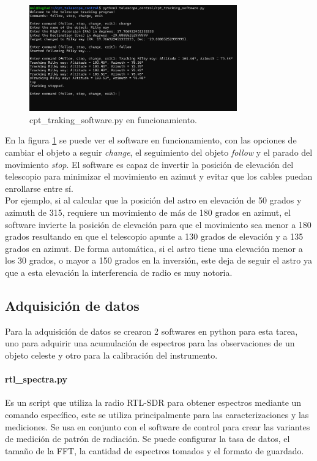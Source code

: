 \begin{figure}
    \centering
    \includegraphics[width=0.8\textwidth]{img/traking}
    \caption{cpt\_traking\_software.py en funcionamiento.}
    \label{fig:control}
\end{figure}

En la figura \ref{fig:control} se puede ver el software en funcionamiento, con las opciones de cambiar el objeto a seguir \textit{change}, el seguimiento del objeto \textit{follow} y el parado del movimiento \textit{stop}. El software es capaz de invertir la posición de elevación del telescopio para minimizar el movimiento en azimut y evitar que los cables puedan enrollarse entre sí.\\

Por ejemplo, si al calcular que la posición del astro en elevación de 50 grados y azimuth de 315, requiere un movimiento de más de 180 grados en azimut, el software invierte la posición de elevación para que el movimiento sea menor a 180 grados resultando en que el telescopio apunte a 130 grados de elevación y a 135 grados en azimut. De forma automática, si el astro tiene una elevación menor a los 30 grados, o mayor a 150 grados en la inversión, este deja de seguir el astro ya que a esta elevación la interferencia de radio es muy notoria.\\

\subsection{Adquisición de datos} 

Para la adquisición de datos se crearon 2 softwares en python para esta tarea, uno para adquirir una acumulación de espectros para las observaciones de un objeto celeste y otro para la calibración del instrumento.\\

\paragraph{rtl\_spectra.py} Es un script que utiliza la radio RTL-SDR para obtener espectros mediante un comando específico, este se utiliza principalmente para las caracterizaciones y las mediciones. Se usa en conjunto con el software de control para crear las variantes de medición de patrón de radiación. Se puede configurar la tasa de datos, el tamaño de la FFT, la cantidad de espectros tomados y el formato de guardado.\\

